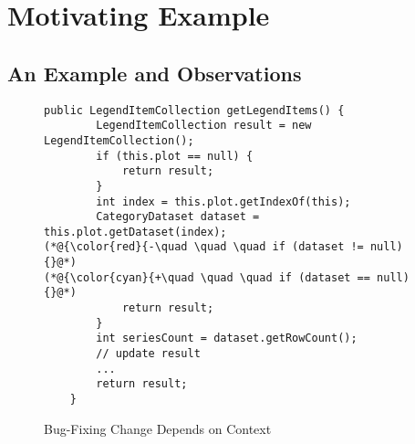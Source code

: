 \section{Motivating Example}
\label{motiv:sec}

\subsection{An Example and Observations}

\begin{figure}[t]
	\centering
	\begin{lstlisting}[]
    public LegendItemCollection getLegendItems() {
        LegendItemCollection result = new LegendItemCollection();
        if (this.plot == null) {
            return result;
        }
        int index = this.plot.getIndexOf(this);
        CategoryDataset dataset = this.plot.getDataset(index);
(*@{\color{red}{-\quad \quad \quad if (dataset != null) {}@*)
(*@{\color{cyan}{+\quad \quad \quad if (dataset == null) {}@*)
            return result;
        }
        int seriesCount = dataset.getRowCount();
        // update result
        ...
        return result;
    }
	\end{lstlisting}
        \vspace{-15pt}
        \caption{Bug-Fixing Change Depends on Context}
        \vspace{-8pt}
        \label{fig:motiv}
\end{figure}


